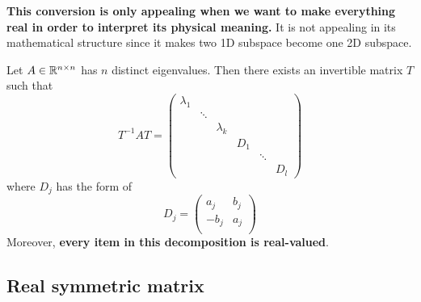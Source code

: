 \begin{refsection}
\begin{remark}
\textbf{This conversion is only appealing when we want to make everything real in order to interpret its physical meaning.} It is not appealing in its mathematical structure since it makes two 1D subspace become one 2D subspace.
\end{remark}


\begin{corollary}
Let $A\in \mathbb{R}^{n\times n}$ has $n$ distinct eigenvalues. Then there exists an invertible matrix $T$ such that
$$T^{-1}AT = \begin{pmatrix}
\lambda_1 &  &  &  &  & \\ 
 & \ddots &  &  &  & \\ 
 &  &  \lambda_k&  &  & \\ 
 &  &  &  D_1 & & \\ 
 &  &  &  & \ddots & \\ 
 &  &  &  &  & D_l
\end{pmatrix}$$
where $D_j$ has the form of $$D_j = \begin{pmatrix}
a_j & b_j\\
-b_j & a_j\\
\end{pmatrix} $$
Moreover, \textbf{every item in this decomposition is real-valued}.
\end{corollary}


\subsection{Real symmetric matrix}

\end{refsection}
